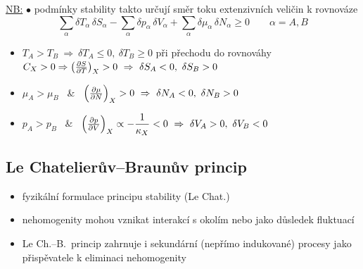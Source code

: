 \underline{NB:} $\bullet$ podmínky stability takto určují směr toku extenzivních veličin k rovnováze
\[
  \sum_\alpha\delta T_\alpha\,\delta S_\alpha - \sum_\alpha\delta p_\alpha\,\delta V_\alpha + \sum_\alpha\delta\mu_\alpha\,\delta N_\alpha \geq 0
  \qquad \alpha = A, B
\]
\begin{itemize}
  \item $T_A > T_B \ \Rightarrow\ \delta T_A \leq 0,\ \delta T_B \geq 0$ při přechodu do rovnováhy \\
        $C_X > 0 \Rightarrow \left(\pdv{S}{T}\right)_X > 0 \ \Rightarrow\ \delta S_A < 0,\ \delta S_B > 0$
  \item $\mu_A > \mu_B$ \ \& \ $\left(\pdv{\mu}{N}\right)_X > 0 \ \Rightarrow\ \delta N_A < 0,\ \delta N_B > 0$
  \item $p_A > p_B$ \ \& \ $\left(\pdv{p}{V}\right)_X \propto -\dfrac{1}{\kappa_X} < 0 \ \Rightarrow\ \delta V_A > 0,\ \delta V_B < 0$
\end{itemize}

\subsection{Le Chatelierův--Braunův princip}
\begin{veta}
\end{veta}
\begin{itemize}[nosep]
  \item[--] fyzikální formulace principu stability (Le Chat.)
\end{itemize}
\begin{itemize}[nosep]
  \item[--] nehomogenity mohou vznikat interakcí s okolím nebo jako důsledek fluktuací
  \item[--] Le Ch.--B.\ princip zahrnuje i sekundární (nepřímo indukované) procesy jako přispěvatele k eliminaci nehomogenity
\end{itemize}

